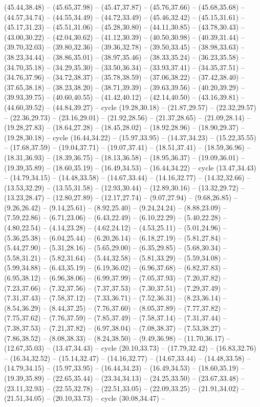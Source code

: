 {(45.44,38.48) -- (45.65,37.98) -- (45.47,37.87) -- (45.76,37.66) -- (45.68,35.68) -- (44.57,34.74) -- (44.55,34.49) -- (44.72,33.49) -- (45.46,32.42) -- (45.15,31.61) -- (45.17,31.23) -- (45.51,31.06) -- (45.28,30.80) -- (44.11,30.85) -- (43.78,30.43) -- (43.00,30.22) -- (42.04,30.62) -- (41.12,30.39) -- (40.50,30.98) -- (40.39,31.44) -- (39.70,32.03) -- (39.80,32.36) -- (39.36,32.78) -- (39.50,33.45) -- (38.98,33.63) -- (38.23,34.44) -- (38.86,35.01) -- (38.97,35.46) -- (38.33,35.24) -- (36.23,35.58) -- (34.70,35.18) -- (34.29,35.30) -- (33.50,36.34) -- (33.93,37.41) -- (34.35,37.51) -- (34.76,37.96) -- (34.72,38.37) -- (35.78,38.59) -- (37.06,38.22) -- (37.42,38.40) -- (37.65,38.18) -- (38.23,38.20) -- (38.71,39.39) -- (39.63,39.56) -- (40.20,39.29) -- (39.93,39.75) -- (40.60,40.55) -- (41.42,40.12) -- (42.14,40.50) -- (43.16,39.81) -- (44.60,39.52) -- (44.84,39.27) -- cycle (19.28,30.18) -- (21.87,29.57) -- (22.32,29.57) -- (22.36,29.73) -- (23.16,29.01) -- (21.92,28.56) -- (21.37,28.65) -- (21.09,28.14) -- (19.28,27.83) -- (18.64,27.28) -- (18.45,28.02) -- (18.92,28.96) -- (18.90,29.37) -- (19.28,30.18) -- cycle (16.44,34.22) -- (15.97,33.95) -- (14.37,34.23) -- (15.22,35.55) -- (17.68,37.59) -- (19.04,37.71) -- (19.07,37.41) -- (18.51,37.41) -- (18.59,36.96) -- (18.31,36.93) -- (18.39,36.75) -- (18.13,36.58) -- (18.95,36.37) -- (19.09,36.01) -- (19.39,35.89) -- (18.60,35.19) -- (16.49,34.53) -- (16.44,34.22) -- cycle (13.47,34.43) -- (14.79,34.15) -- (14.48,33.58) -- (14.67,33.44) -- (14.16,32.77) -- (14.32,32.66) -- (13.53,32.29) -- (13.55,31.58) -- (12.93,30.44) -- (12.89,30.16) -- (13.32,29.72) -- (13.23,28.47) -- (12.80,27.89) -- (12.17,27.74) -- (9.07,27.94) -- (9.68,26.85) -- (9.26,26.42) -- (9.14,25.61) -- (8.92,25.40) -- (9.24,24.24) -- (8.88,23.09) -- (7.59,22.86) -- (6.71,23.06) -- (6.43,22.49) -- (6.10,22.29) -- (5.40,22.28) -- (4.80,22.54) -- (4.14,23.28) -- (4.62,24.12) -- (4.53,25.11) -- (5.01,24.96) -- (5.36,25.38) -- (6.04,25.44) -- (6.20,26.14) -- (6.18,27.19) -- (5.81,27.84) -- (5.44,27.90) -- (5.31,28.16) -- (5.65,29.00) -- (6.35,29.85) -- (5.68,30.34) -- (5.58,31.21) -- (5.82,31.64) -- (5.44,32.58) -- (5.81,33.29) -- (5.59,34.08) -- (5.99,34.88) -- (6.43,35.19) -- (6.19,36.02) -- (6.96,37.68) -- (6.82,37.83) -- (6.95,38.12) -- (6.96,38.06) -- (6.99,37.99) -- (7.05,37.93) -- (7.20,37.82) -- (7.23,37.66) -- (7.32,37.56) -- (7.37,37.53) -- (7.30,37.51) -- (7.29,37.49) -- (7.31,37.43) -- (7.58,37.12) -- (7.33,36.71) -- (7.52,36.31) -- (8.23,36.14) -- (8.54,36.29) -- (8.44,37.25) -- (7.76,37.60) -- (8.05,37.89) -- (7.77,37.82) -- (7.75,37.62) -- (7.76,37.59) -- (7.85,37.49) -- (7.58,37.14) -- (7.31,37.44) -- (7.38,37.53) -- (7.21,37.82) -- (6.97,38.04) -- (7.08,38.37) -- (7.53,38.27) -- (7.86,38.52) -- (8.08,38.33) -- (8.24,38.50) -- (9.49,36.98) -- (11.70,36.17) -- (12.67,35.03) -- (13.47,34.43) -- cycle (20.10,33.73) -- (17.79,32.42) -- (16.83,32.76) -- (16.34,32.52) -- (15.14,32.47) -- (14.16,32.77) -- (14.67,33.44) -- (14.48,33.58) -- (14.79,34.15) -- (15.97,33.95) -- (16.44,34.23) -- (16.49,34.53) -- (18.60,35.19) -- (19.39,35.89) -- (22.65,35.44) -- (23.34,34.13) -- (24.25,33.50) -- (23.67,33.48) -- (23.11,32.93) -- (22.55,32.78) -- (22.51,33.05) -- (22.09,33.25) -- (21.91,34.02) -- (21.51,34.05) -- (20.10,33.73) -- cycle (30.08,34.47) -- }
